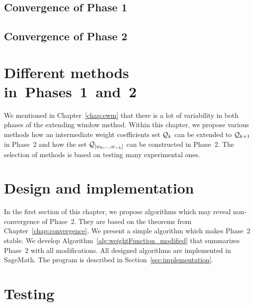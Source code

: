	\section{Convergence of Phase 1}
	

	\section{Convergence of Phase 2}
	
	

	


\chapter{Different methods in~Phases~1~and~2}
	\label{chap:diffChoices}
	We mentioned in Chapter~\ref{chap:ewm} that there is a lot of variability in both phases of the extending window method. Within this chapter, we propose various methods how an intermediate weight coefficients set $\mathcal{Q}_k$ can be extended to $\mathcal{Q}_{k+1}$ in Phase~2 and how the set $\mathcal{Q}_{[w_{0}, \dots, w_{-k}]}$ can be constructed in Phase~2. The selection of methods is based on testing many experimental ones. 

	

	

	
	


\chapter{Design and implementation}

In the first section of this chapter, we propose algorithms which may reveal non-convergence of Phase~2. They are based on the theorems from Chapter~\ref{chap:convergence}. We present a simple algorithm which makes Phase~2 stable. We develop Algorithm~\ref{alg:weightFunction_modified} that summarizes  Phase~2 with all modifications. All designed algorithms are implemented in SageMath. The program is described in Section~\ref{sec:implementation}.
\label{chap:design}
	
	

\chapter{Testing}
\label{chap:testing}
	


\cleardoublepage{}
{}
